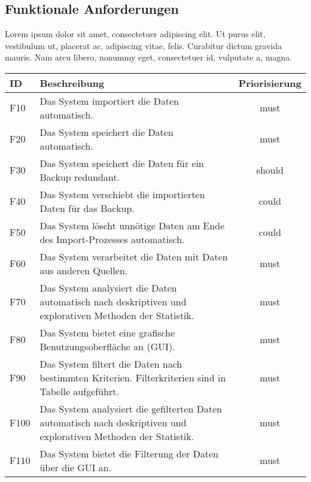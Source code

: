 \subsection{Funktionale Anforderungen}
Lorem ipsum dolor sit amet, consectetuer adipiscing elit. Ut purus elit, vestibulum ut, 
placerat ac, adipiscing vitae, felis. Curabitur dictum gravida mauris. Nam arcu libero, nonummy eget, consectetuer id, vulputate a, magna.\begingroup
\setlength{\tabcolsep}{12pt} %
\renewcommand{\arraystretch}{1.5} 
\begin{table}[H]
    \centering
    \begin{adjustbox}{max width=\textwidth}
    \begin{tabular}{llc}
       \toprule
       \textbf{ID}          & \textbf{Beschreibung} &\textbf{Priorisierung}\\
       \midrule
        F10                               &Das System importiert die Daten automatisch. & must\\
        F20                               &Das System speichert die Daten automatisch.  & must\\
        F30                               &Das System speichert die Daten für ein Backup redundant.  & should\\
        F40                               &Das System verschiebt die importierten Daten für das Backup.  & could\\
        F50                               &Das System löscht unnötige Daten am Ende des Import-Prozesses automatisch.  & could\\
        F60                               &Das System verarbeitet die Daten mit Daten aus anderen Quellen.  & must\\
        F70                               &Das System analysiert die Daten automatisch nach deskriptiven und explorativen Methoden der Statistik.  & must\\
        F80                               &Das System bietet eine grafische Benutzungsoberfläche an (GUI).  & must\\
        F90                               &Das System filtert die Daten nach bestimmten Kriterien. Filterkriterien sind in Tabelle aufgeführt. & must\\
        F100                              &Das System analysiert die gefilterten Daten automatisch nach deskriptiven und explorativen Methoden der Statistik. & must\\
        F110                              &Das System bietet die Filterung der Daten über die GUI an.  & must\\

\end{tabular}
\end{adjustbox}
\end{table}
